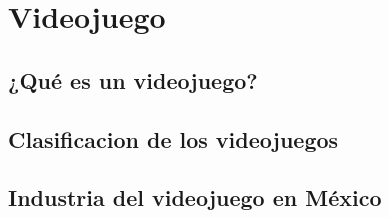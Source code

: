 \section{Videojuego}
			\subsection{¿Qué es un videojuego?}
			\subsection{Clasificacion de los videojuegos}
			\subsection{Industria del videojuego en México}	
		
